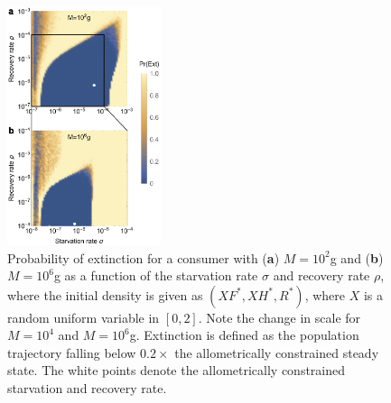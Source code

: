 \documentclass[twocolumn,preprintnumbers,amsmath,amssymb,superscriptaddress]{revtex4}
\begin{document}



\begin{figure}
\centering
\includegraphics[width=0.4\textwidth]{fig_ExtinctionAllometricComb4.eps}
\caption{\small{ Probability of extinction for a consumer with ({\bf a}) $M=10^2$g and ({\bf b}) $M=10^6$g as a function of the starvation rate $\sigma$ and recovery rate $\rho$, where the initial density is given as $(XF^*,XH^*,R^*)$, where $X$ is a random uniform variable in $[0,2]$. Note the change in scale for $M=10^4$ and $M=10^6$g.  Extinction is defined as the population trajectory falling below $0.2\times$ the allometrically constrained steady state. The white points denote the allometrically constrained starvation and recovery rate.}\label{fig:ext}}
\end{figure}
\end{document}
